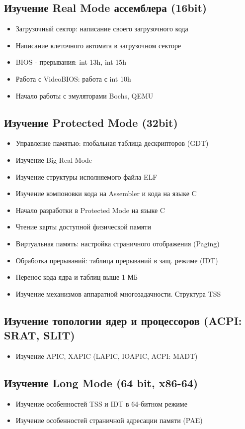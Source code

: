 \documentclass[a4paper,12pt]{extarticle}
\begin{document}
		\subsection{Изучение Real Mode ассемблера (16bit)}
			\begin{itemize}
				\item Загрузочный сектор: написание своего загрузочного кода
				\item Написание клеточного автомата в загрузочном секторе
				\item BIOS - прерывания: int 13h, int 15h
				\item Работа с VideoBIOS: работа с int 10h
				\item Начало работы с эмуляторами Bochs, QEMU
			\end{itemize}
		\subsection{Изучение Protected Mode (32bit)}
			\begin{itemize}
				\item Управление памятью: глобальная таблица дескрипторов (GDT)
				\item Изучение Big Real Mode
				\item Изучение структуры исполняемого файла ELF
				\item Изучение компоновки кода на Assembler и кода на языке C
				\item Начало разработки в Protected Mode на языке C
				\item Чтение карты доступной физической памяти
				\item Виртуальная память: настройка страничного отображения (Paging)
				\item Обработка прерываний: таблица прерываний в защ. режиме (IDT)
				\item Перенос кода ядра и таблиц выше 1 МБ
				\item Изучение механизмов аппаратной многозадачности. Структура TSS
			\end{itemize}
		\subsection{Изучение топологии ядер и процессоров (ACPI: SRAT, SLIT)}
			\begin{itemize}
				\item Изучение APIC, XAPIC (LAPIC, IOAPIC, ACPI: MADT)
			\end{itemize}
		\subsection{Изучение Long Mode (64 bit, x86-64)}
			\begin{itemize}
				\item Изучение особенностей TSS и IDT в 64-битном режиме
				\item Изучение особенностей страничной адресации памяти (PAE)
			\end{itemize}
\end{document}
